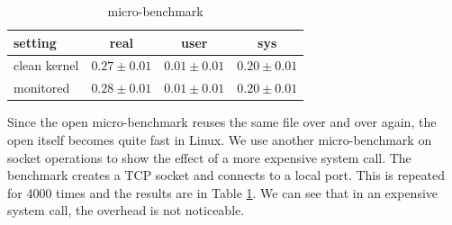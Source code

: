 \begin{table}[ht]
\centering
\begin{tabular}{ | l || c | c | c | }
\hline
setting & real & user & sys \\
\hline
clean kernel & \begin{math} 0.27\pm0.01 \end{math} & \begin{math} 0.01\pm0.01 \end{math} & \begin{math} 0.20\pm0.01 \end{math} \\
monitored & \begin{math} 0.28\pm0.01 \end{math} & \begin{math} 0.01\pm0.01 \end{math} & \begin{math} 0.20\pm0.01 \end{math} \\
\hline
\end{tabular}
\caption{ micro-benchmark}
\label{tab:lbox-connect}
\end{table}

Since the open micro-benchmark reuses the same file over and over again,
the open itself becomes quite fast in Linux. 
We use another micro-benchmark on socket
operations to show the effect of a more expensive system call.
The benchmark creates a TCP socket and connects to a local port.
This is repeated for 4000 times and the results are in Table \ref{tab:lbox-connect}.
We can see that in an expensive system call, the overhead is not noticeable.

